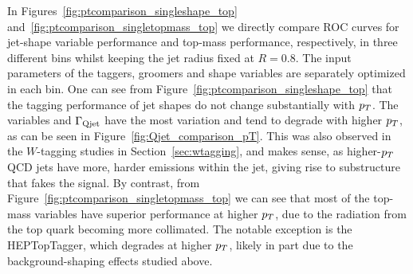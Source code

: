 In Figures~\ref{fig:ptcomparison_singleshape_top} and~\ref{fig:ptcomparison_singletopmass_top} we directly compare ROC curves for jet-shape variable performance and top-mass performance, respectively, in three different \pt bins  whilst keeping the jet radius fixed at $R=0.8$. The input parameters of the taggers, groomers and shape variables are separately optimized in each \pt bin.  One can see from Figure~\ref{fig:ptcomparison_singleshape_top} that the tagging performance of jet shapes do not change substantially with $p_T$. The variables \tauthreetwo and $\Gamma_{\rm Qjet}$ have the most variation and tend to degrade with higher $p_T$, as can be seen in Figure~\ref{fig:Qjet_comparison_pT}. This was also observed in the $W$-tagging studies in Section~\ref{sec:wtagging}, and makes sense, as higher-$p_T$ QCD jets have more, harder emissions within the jet, giving rise to substructure that fakes the signal. By contrast, from Figure~\ref{fig:ptcomparison_singletopmass_top} we can see that most of the top-mass variables have superior performance at higher $p_T$, due to the radiation from the top quark becoming more collimated. The notable exception is the HEPTopTagger, which degrades at higher $p_T$, likely in part due to the background-shaping effects studied above.



